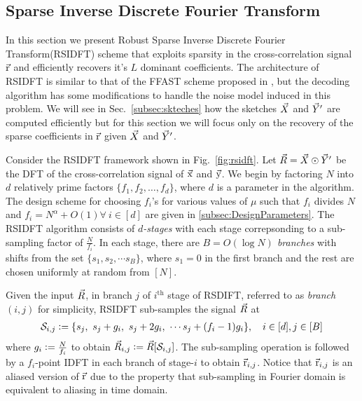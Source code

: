\subsection{Sparse Inverse Discrete Fourier Transform}
\label{subsec:RSIDFT}	
 In this section we present Robust Sparse Inverse Discrete Fourier Transform(RSIDFT) scheme that exploits sparsity in the cross-correlation signal $\vec{\mathrm{r}}$ and efficiently recovers it's $L$ dominant coefficients. The architecture of RSIDFT is similar to that of the FFAST scheme proposed in \cite{pawar2014robust}, but the decoding algorithm has some modifications to handle the noise model induced in this problem. We will see in Sec.~\ref{subsec:skteches} how the sketches $\vec{X}$ and $\vec{Y}'$ are computed efficiently but for this section we will focus only on the recovery of the sparse coefficients in $\vec{\mathrm{r}}$ given $\vec{X}$ and $\vec{Y}'$.
	  	
Consider the RSIDFT framework shown in Fig.~\ref{fig:rsidft}. Let $ \vec{R} =\vec{X} \odot \vec{Y}'$ be the DFT of the cross-correlation signal of $\vec{\mathrm{x}}$ and $\vec{\mathrm{y}}$. We begin by factoring $N$ into $d$ relatively prime factors $\{f_1,f_2,\ldots,f_d\}$, where $d$ is a parameter in the algorithm. The design scheme for choosing $f_i$'s for various values of $\mu$ such that $f_i$ divides $N$ and $f_i=N^{\alpha}+O(1) \forall ~i\in[d]$ are given in \ref{subsec:DesignParameters}. The RSIDFT algorithm consists of {\it $d$-stages} with each stage correpsonding to a sub-sampling factor of $\frac{N}{f_i}$. In each stage, there are {\it $B= O(\log N)$ branches} with shifts from the set $ \{s_1, s_2, \cdots s_B\} $, where $s_1 =0$ in the first branch and the rest are chosen uniformly at random from $[N]$.
	   	 	
	 Given the input $\vec{R}$, in branch $j$ of $i^{\text{th}}$ stage of RSDIFT, referred to as \textit{branch $(i,j)$} for simplicity, RSIDFT sub-samples the signal $\vec{R}$ at
\begin{align}
\label{Eqn:SamplingSets}
	 \mathcal{S}_{i,j} \mathrel{\mathop:}= \{s_j,\ s_j + g_i,\ s_j + 2g_i,\ \cdots s_j + (f_i-1) g_i\}, \quad i\in[d], j\in[B]
\end{align}
where $g_i\mathrel{\mathop:}= \frac{N}{f_i}$ to obtain $\vec{R}_{i,j}\mathrel{\mathop:}=\vec{R}[\mathcal{S}_{i,j}]$. The sub-sampling operation is followed by a $f_i$-point IDFT in each branch of stage-$i$ to obtain $ \vec{\mathrm{r}}_{i,j}$. Notice that $ \vec{\mathrm{r}}_{i,j}$ is an aliased version of $\vec{\mathrm{r}}$ due to the property that sub-sampling in Fourier domain is equivalent to aliasing in time domain.

